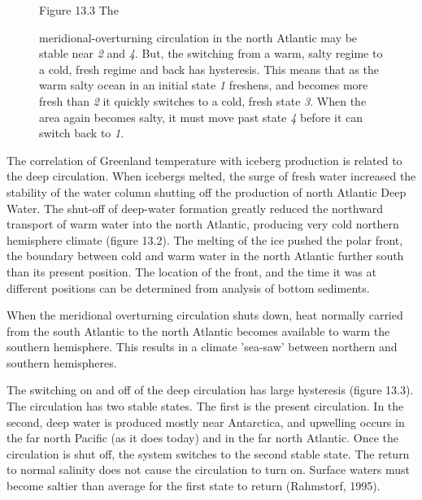 \begin{enumerate}
\begin{figure}[b!]
\vspace{-2ex}
\footnotesize
Figure 13.3 The \rule{0mm}{3ex}meridional-overturning
circulation in the north
Atlantic may be stable near \textit{2} and \textit{4}. But, the
switching from a warm, salty regime to a cold, fresh regime and back
has hysteresis. This means that as the warm salty ocean in an initial
state \textit{1} freshens, and becomes more fresh than \textit{2} it
quickly switches to a cold, fresh state \textit{3}. When the area
again becomes salty, it must move past state \textit{4} before it can
switch back to \textit{1}.
\label{fig:hysteresis}
\end{figure}

\vitem The correlation of Greenland temperature with iceberg
production is related to the deep circulation. When icebergs melted,
the surge of fresh water increased the stability of the water column
shutting off the production of north Atlantic Deep Water. The shut-off of deep-water formation greatly
reduced the northward transport of
warm water into the north Atlantic, producing very cold northern
hemisphere climate (figure 13.2). The melting of the ice pushed the
polar front, the boundary between cold and warm water in the north
Atlantic further south than its present position. The location of the
front, and the time it was at different positions can be determined
from analysis of bottom sediments.

\vitem When the meridional overturning
circulation shuts down, heat
normally carried from the south Atlantic to the north Atlantic becomes
available to warm the southern hemisphere. This results in a climate
'sea-saw' between northern and southern hemispheres.

\vitem The switching on and off of the deep circulation has large
hysteresis (figure 13.3). The circulation has two stable states. The
first is the present circulation. In the second, deep water is
produced mostly near Antarctica, and upwelling occurs in the far north Pacific (as it does today)
and in the far north Atlantic. Once the circulation is shut off, the
system switches to the second stable state. The return to normal
salinity does not cause the circulation to turn on. Surface waters
must become saltier than average for the first state to return
(Rahmstorf, 1995).


\end{enumerate}
